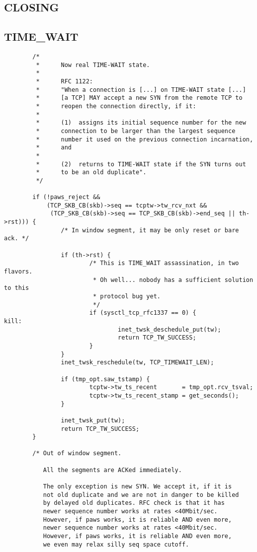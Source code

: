 \subsection{CLOSING}

\subsection{TIME\_WAIT}
\begin{verbatim}
        /*
         *      Now real TIME-WAIT state.
         *
         *      RFC 1122:
         *      "When a connection is [...] on TIME-WAIT state [...]
         *      [a TCP] MAY accept a new SYN from the remote TCP to
         *      reopen the connection directly, if it:
         *
         *      (1)  assigns its initial sequence number for the new
         *      connection to be larger than the largest sequence
         *      number it used on the previous connection incarnation,
         *      and
         *
         *      (2)  returns to TIME-WAIT state if the SYN turns out
         *      to be an old duplicate".
         */

        if (!paws_reject &&
            (TCP_SKB_CB(skb)->seq == tcptw->tw_rcv_nxt &&
             (TCP_SKB_CB(skb)->seq == TCP_SKB_CB(skb)->end_seq || th->rst))) {
                /* In window segment, it may be only reset or bare ack. */

                if (th->rst) {
                        /* This is TIME_WAIT assassination, in two flavors.
                         * Oh well... nobody has a sufficient solution to this
                         * protocol bug yet.
                         */
                        if (sysctl_tcp_rfc1337 == 0) {
kill:
                                inet_twsk_deschedule_put(tw);
                                return TCP_TW_SUCCESS;
                        }
                }
                inet_twsk_reschedule(tw, TCP_TIMEWAIT_LEN);

                if (tmp_opt.saw_tstamp) {
                        tcptw->tw_ts_recent       = tmp_opt.rcv_tsval;
                        tcptw->tw_ts_recent_stamp = get_seconds();
                }

                inet_twsk_put(tw);
                return TCP_TW_SUCCESS;
        }

        /* Out of window segment.

           All the segments are ACKed immediately.

           The only exception is new SYN. We accept it, if it is
           not old duplicate and we are not in danger to be killed
           by delayed old duplicates. RFC check is that it has
           newer sequence number works at rates <40Mbit/sec.
           However, if paws works, it is reliable AND even more,
           newer sequence number works at rates <40Mbit/sec.
           However, if paws works, it is reliable AND even more,
           we even may relax silly seq space cutoff.


\end{verbatim}
